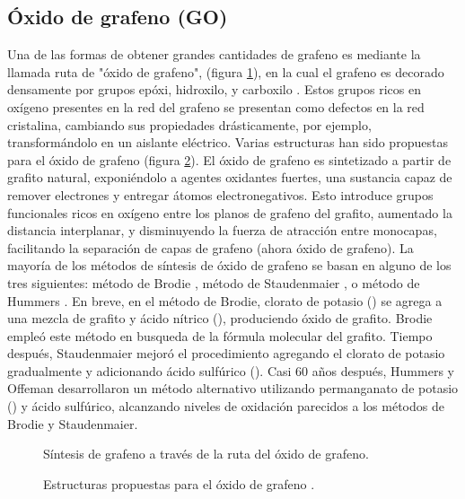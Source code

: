 \subsection{Óxido de grafeno (GO)}
Una de las formas de obtener grandes cantidades de grafeno es mediante la llamada ruta de "óxido de grafeno", (figura \ref{fig:graphiteToRGO}), en la cual el grafeno es decorado densamente por grupos epóxi, hidroxilo, y carboxilo \citep{Dreyer2010}. Estos grupos ricos en oxígeno presentes en la red del grafeno se presentan como defectos en la red cristalina, cambiando sus propiedades drásticamente, por ejemplo, transformándolo en un aislante eléctrico. Varias estructuras han sido propuestas para el óxido de grafeno (figura \ref{fig:GO_structure}).
El óxido de grafeno es sintetizado a partir de grafito natural, exponiéndolo a agentes oxidantes fuertes, una sustancia capaz de remover electrones y entregar átomos electronegativos. Esto introduce grupos funcionales ricos en oxígeno entre los planos de grafeno del grafito, aumentado la distancia interplanar, y disminuyendo la fuerza de atracción entre monocapas, facilitando la separación de capas de grafeno (ahora óxido de grafeno). La mayoría de los métodos de síntesis de óxido de grafeno se basan en alguno de los tres siguientes: método de Brodie \citep{Brodie1859}, método de Staudenmaier \citep{Staudenmaier1898}, o método de Hummers \citep{Hummers1958}. En breve, en el método de Brodie, clorato de potasio () se agrega a una mezcla de grafito y ácido nítrico (), produciendo óxido de grafito. Brodie empleó este método en busqueda de la fórmula molecular del grafito. Tiempo después, Staudenmaier mejoró el procedimiento agregando el clorato de potasio gradualmente y adicionando ácido sulfúrico (). Casi 60 años después, Hummers y Offeman desarrollaron un método alternativo utilizando permanganato de potasio () y ácido sulfúrico, alcanzando niveles de oxidación parecidos a los métodos de Brodie y Staudenmaier.
\begin{figure}
	\centering
	\caption[Síntesis de grafeno a través de la ruta del óxido de grafeno]{Síntesis de grafeno a través de la ruta del óxido de grafeno.}
	\label{fig:graphiteToRGO}
\end{figure}

\begin{figure}
	\centering
	\caption[Estructura de óxido de grafeno]{Estructuras propuestas para el óxido de grafeno \citep{Dreyer2010}.}
	\label{fig:GO_structure}
\end{figure}


